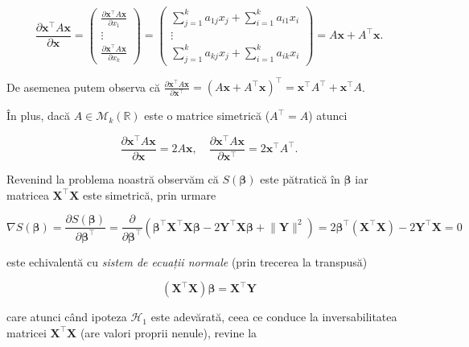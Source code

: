 \documentclass[]{article}
\begin{document}
\[
  \frac{\partial \boldsymbol x^\intercal  A \boldsymbol x}{\partial \boldsymbol x} = \begin{pmatrix}\frac{\partial \boldsymbol x^\intercal  A \boldsymbol x}{\partial x_1}\\
  \vdots\\
  \frac{\partial \boldsymbol x^\intercal  A \boldsymbol x}{\partial x_k}\end{pmatrix} = \begin{pmatrix}\sum_{j = 1}^{k}a_{1j}x_j + \sum_{i = 1}^{k}a_{i1}x_i\\
  \vdots\\
  \sum_{j = 1}^{k}a_{kj}x_j + \sum_{i = 1}^{k}a_{ik}x_i\end{pmatrix} = A\boldsymbol x + A^\intercal \boldsymbol x.
\]

De asemenea putem observa că
\(\frac{\partial \boldsymbol x^\intercal A \boldsymbol x}{\partial \boldsymbol x^\intercal} = \left(A\boldsymbol x + A^\intercal \boldsymbol x\right)^\intercal = \boldsymbol x^\intercal A^\intercal + \boldsymbol x^\intercal A\).

În plus, dacă \(A\in\mathcal{M}_{k}(\mathbb{R})\) este o matrice
simetrică (\(A^\intercal = A\)) atunci

\[
  \frac{\partial \boldsymbol x^\intercal  A \boldsymbol x}{\partial \boldsymbol x} = 2A\boldsymbol x, \quad \frac{\partial \boldsymbol x^\intercal  A \boldsymbol x}{\partial \boldsymbol x^\intercal} = 2\boldsymbol x^\intercal A^\intercal.
\]

Revenind la problema noastră observăm că \(S(\boldsymbol \beta)\) este
pătratică în \(\boldsymbol \beta\) iar matricea
\(\boldsymbol X^\intercal \boldsymbol X\) este simetrică, prin urmare

\[
\nabla S(\boldsymbol \beta) = \frac{\partial S(\boldsymbol \beta)}{\partial \boldsymbol \beta^\intercal} = \frac{\partial }{\partial \boldsymbol \beta^\intercal}\left(\boldsymbol \beta^\intercal \boldsymbol X^\intercal \boldsymbol X \boldsymbol\beta - 2 \boldsymbol Y^\intercal \boldsymbol X \boldsymbol\beta + \lVert  \boldsymbol Y \rVert^2\right) = 2 \boldsymbol \beta^\intercal (\boldsymbol X^\intercal \boldsymbol X)  - 2 \boldsymbol Y^\intercal \boldsymbol X = 0 
\]

este echivalentă cu \emph{sistem de ecuații normale} (prin trecerea la
transpusă)

\[
(\boldsymbol X^\intercal \boldsymbol X)\boldsymbol \beta = \boldsymbol X^\intercal\boldsymbol Y
\]

care atunci când ipoteza \(\mathcal{H}_1\) este adevărată, ceea ce
conduce la inversabilitatea matricei
\(\boldsymbol X^\intercal \boldsymbol X\) (are valori proprii nenule),
revine la
\end{document}
